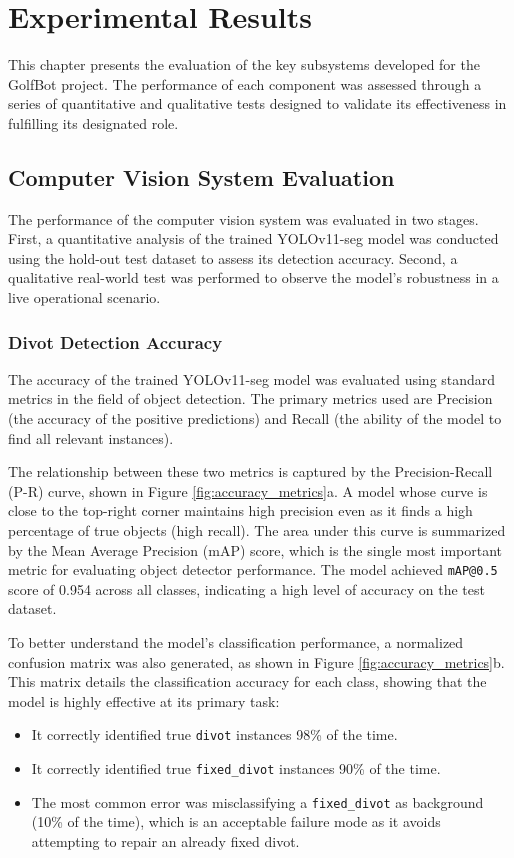 
\chapter{Experimental Results}
\label{chap:validation}
This chapter presents the evaluation of the key subsystems developed for the GolfBot project. The performance of each component was assessed through a series of quantitative and qualitative tests designed to validate its effectiveness in fulfilling its designated role.

\section{Computer Vision System Evaluation}
\label{sec:cv_evaluation}
The performance of the computer vision system was evaluated in two stages. First, a quantitative analysis of the trained YOLOv11-seg model was conducted using the hold-out test dataset to assess its detection accuracy. Second, a qualitative real-world test was performed to observe the model's robustness in a live operational scenario.

\subsection{Divot Detection Accuracy}
\label{ssec:cv_accuracy}

The accuracy of the trained YOLOv11-seg model was evaluated using standard metrics in the field of object detection. The primary metrics used are Precision (the accuracy of the positive predictions) and Recall (the ability of the model to find all relevant instances).

The relationship between these two metrics is captured by the Precision-Recall (P-R) curve, shown in Figure \ref{fig:accuracy_metrics}a. A model whose curve is close to the top-right corner maintains high precision even as it finds a high percentage of true objects (high recall). The area under this curve is summarized by the Mean Average Precision (mAP) score, which is the single most important metric for evaluating object detector performance. The model achieved \texttt{mAP@0.5} score of 0.954 across all classes, indicating a high level of accuracy on the test dataset.

To better understand the model's classification performance, a normalized confusion matrix was also generated, as shown in Figure \ref{fig:accuracy_metrics}b. This matrix details the classification accuracy for each class, showing that the model is highly effective at its primary task:
\begin{itemize}
    \item It correctly identified true \texttt{divot} instances 98\% of the time.
    \item It correctly identified true \texttt{fixed\_divot} instances 90\% of the time.
    \item The most common error was misclassifying a \texttt{fixed\_divot} as background (10\% of the time), which is an acceptable failure mode as it avoids attempting to repair an already fixed divot.
\end{itemize}

